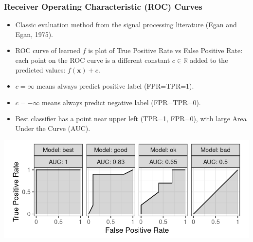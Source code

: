 \documentclass[t]{beamer}
\begin{document}
\begin{frame}
  \frametitle{Receiver Operating Characteristic (ROC) Curves}
  \begin{itemize}
  \item Classic evaluation method from the signal processing
    literature (Egan and Egan, 1975).
  \item ROC curve of learned $f$ is plot of True
    Positive Rate vs False Positive Rate: each point on the ROC curve
    is a different constant $c\in\mathbb R$ added to the predicted
    values: $f(\mathbf x)+c$.
  \item $c=\infty$ means always predict positive label (FPR=TPR=1).
  \item $c=-\infty$ means always predict negative label (FPR=TPR=0).
  \item Best classifier has a point near upper left (TPR=1, FPR=0), with large
    Area Under the Curve (AUC).
  \end{itemize}
  \includegraphics[width=\textwidth]{figure-more-than-one-new-binary}
\end{frame}
\end{document}
